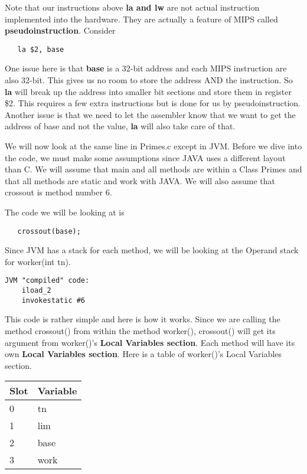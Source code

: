 \documentclass[11pt]{article}
\begin{document}
Note that our instructions above {\bf la and lw} are not actual instruction implemented into the hardware. They are actually a feature of MIPS called {\bf pseudoinstruction}. Consider 

\begin{verbatim}
   la $2, base
\end{verbatim}

One issue here is that {\bf base} is a 32-bit address and each MIPS instruction are also 32-bit. This gives us no room to store the address AND the instruction. So {\bf la} will break up the address into smaller bit sections and store them in register \$2. This requires a few extra instructions but is done for us by pseudoinstruction. Another issue is that we need to let the assembler know that we want to get the address of base and not the value, {\bf la} will also take care of that.


We will now look at the same line in Primes.c except in JVM. Before we dive into the code, we must make some assumptions since JAVA uses a different layout than C. We will assume that main and all methods are within a Class Primes and that all methods are static and work with JAVA. We will also assume that crossout is method number 6.

The code we will be looking at is 
\begin{verbatim}
   crossout(base);
\end{verbatim}

Since JVM has a stack for each method, we will be looking at the Operand stack for worker(int tn).

\begin{verbatim}
JVM "compiled" code:
    iload_2
    invokestatic #6
\end{verbatim}

This code is rather simple and here is how it works. Since we are calling the method crossout() from within the method worker(), crossout() will get its argument from worker()'s {\bf Local Variables section}. Each method will have its own {\bf Local Variables section}. Here is a table of worker()'s Local Variables section.

\begin{table}[h]
    \begin{tabular}{|l|l|}
        \hline
        Slot & Variable \\ \hline
        0    & tn       \\ 
        1    & lim      \\ 
        2    & base     \\ 
        3    & work     \\
        \hline
    \end{tabular}
\end{table}
\end{document}
